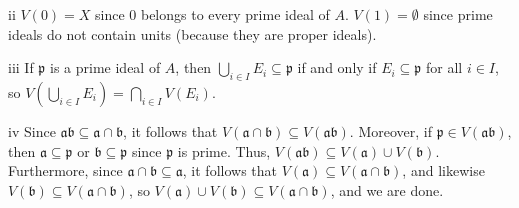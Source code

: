 \begin{partsolution}{1}{15}{ii}
\(V(0) = X\) since \(0\) belongs to every prime ideal of \(A\).
\(V(1) = \emptyset\) since prime ideals do not contain units (because they are proper ideals).
\end{partsolution}

\begin{partsolution}{1}{15}{iii}
If \(\mathfrak{p}\) is a prime ideal of \(A\), then \(\bigcup_{i \in I} E_i \subseteq \mathfrak{p}\) if and only if \(E_i \subseteq \mathfrak{p}\) for all \(i \in I\), so \(V\left(\bigcup_{i\in I} E_i\right) = \bigcap_{i\in I} V(E_i)\).
\end{partsolution}

\begin{partsolution}{1}{15}{iv}
Since \(\mathfrak{a} \mathfrak{b} \subseteq \mathfrak{a} \cap \mathfrak{b}\), it follows that \(V(\mathfrak{a} \cap \mathfrak{b}) \subseteq V(\mathfrak{a} \mathfrak{b})\).
Moreover, if \(\mathfrak{p} \in V(\mathfrak{a} \mathfrak{b})\), then \(\mathfrak{a} \subseteq \mathfrak{p}\) or \(\mathfrak{b} \subseteq \mathfrak{p}\) since \(\mathfrak{p}\) is prime.
Thus, \(V(\mathfrak{a} \mathfrak{b}) \subseteq V(\mathfrak{a}) \cup V(\mathfrak{b})\).
Furthermore, since \(\mathfrak{a} \cap \mathfrak{b} \subseteq \mathfrak{a}\), it follows that \(V(\mathfrak{a}) \subseteq V(\mathfrak{a} \cap \mathfrak{b})\), and likewise \(V(\mathfrak{b}) \subseteq V(\mathfrak{a} \cap \mathfrak{b})\), so \(V(\mathfrak{a}) \cup V(\mathfrak{b}) \subseteq V(\mathfrak{a} \cap \mathfrak{b})\), and we are done.
\end{partsolution}